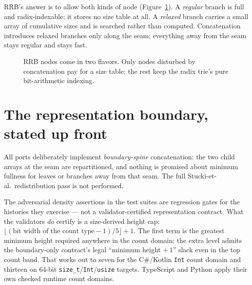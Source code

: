 \documentclass[11pt,twoside,openright]{book}
\newcommand{\code}[1]{\texorpdfstring{\textcolor{d7ink}{\texttt{#1}}}{#1}}
\newcommand{\term}[1]{\textit{#1}}
\begin{document}
RRB's answer is to allow both kinds of node (Figure~\ref{fig:rrb}). A
\term{regular} branch is full and radix-indexable; it stores no size table at
all. A \term{relaxed} branch carries a small array of cumulative sizes and is
searched rather than computed. Concatenation introduces relaxed branches only
along the seam; everything away from the seam stays regular and stays fast.

\begin{figure}[htbp]
\centering
{}
\caption{RRB nodes come in two flavors. Only nodes disturbed by concatenation
pay for a size table; the rest keep the radix trie's pure bit-arithmetic
indexing.}
\label{fig:rrb}
\end{figure}

\section{The representation boundary, stated up front}

\begin{caveatbox}
All ports deliberately implement \emph{boundary-spine} concatenation: the two
child arrays at the seam are repartitioned, and nothing is promised about
minimum fullness for leaves or branches away from that seam. The full
Stucki-et-al.\ redistribution pass is not performed.

The adversarial density assertions in the test suites are regression gates for
the histories they exercise --- not a validator-certified representation
contract. What the validators \emph{do} certify is a size-derived height cap:
$\lfloor (\text{bit width of the count type} - 1)/5 \rfloor + 1$. The first term
is the greatest minimum height required anywhere in the count domain; the extra
level admits the boundary-only contract's legal ``minimum height $+\,1$'' slack
even in the top count band. That works out to seven for the C\#/Kotlin
\code{Int} count domain and thirteen on 64-bit
\code{size\_t}/\code{Int}/\code{usize} targets. TypeScript and Python apply their
own checked runtime count domains.
\end{caveatbox}
\end{document}
